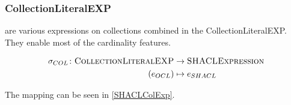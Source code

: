 \documentclass[runningheads]{llncs}
\begin{document}
\subsubsection{CollectionLiteralEXP}
are various expressions on collections combined in the CollectionLiteralEXP.
They enable most of the cardinality features.
\begin{definition}
    \begin{align*}
        \sigma_{COL}\colon\textsc{CollectionLiteralEXP} & \to\textsc{SHACLExpression} \\
        (e_{OCL})                                       & \mapsto e_{SHACL}           \\
    \end{align*}
\end{definition}
The mapping can be seen in \ref{SHACLColExp}.
\end{document}
